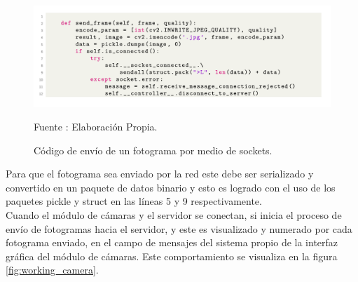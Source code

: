 
\begin{figure}[H]
    \begin{center}
        \includegraphics[width=15cm]{img/capitulo_5/code1.png}
        \caption{Código de envío de un fotograma por medio de sockets.}
        Fuente : Elaboración Propia.
        \label{fig:socket_client}
    \end{center}
\end{figure}

Para que el fotograma sea enviado por la red este debe ser serializado y convertido en un paquete de datos binario y esto es logrado con el uso de los paquetes pickle y struct en las líneas 5 y 9 respectivamente.\\

Cuando el módulo de cámaras y el servidor se conectan, si inicia el proceso de envío de fotogramas hacia el servidor, y este es visualizado y numerado por cada fotograma enviado, en el campo de mensajes del sistema propio de la interfaz gráfica del módulo de cámaras. Este comportamiento se visualiza en la figura \ref{fig:working_camera}.


